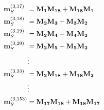 \begin{subequations}
\begin{align}
	  &  	& \mathmakebox[\widthof{$\mathbf{m}^{(3,153)}_S$}][l]{\mathbf{m}^{(3,17)}_S}  &= \mathbf{M_1M_{18}} + \mathbf{M_{18}M_1} & \\ 
	  &  	& \mathmakebox[\widthof{$\mathbf{m}^{(3,153)}_S$}][l]{\mathbf{m}^{(3,18)}_S}  &= \mathbf{M_2M_3} + \mathbf{M_3M_2}  &   	\\
	  &  	& \mathmakebox[\widthof{$\mathbf{m}^{(3,153)}_S$}][l]{\mathbf{m}^{(3,19)}_S}  &= \mathbf{M_2M_4} + \mathbf{M_4M_2}  &   	\\  
	  &  	& \mathmakebox[\widthof{$\mathbf{m}^{(3,153)}_S$}][l]{\mathbf{m}^{(3,20)}_S}  &= \mathbf{M_2M_5} + \mathbf{M_5M_2}  &   	\\
	  &     &  						 &  \vdots & 	\notag \\
	  &  	& \mathmakebox[\widthof{$\mathbf{m}^{(3,153)}_S$}][l]{\mathbf{m}^{(3,33)}_S}  &= \mathbf{M_2M_{18}} + \mathbf{M_{18}M_2}  &  \\
	  &     &  						 &  \vdots 	& 	\notag \\
	  &  	& \mathmakebox[\widthof{$\mathbf{m}^{(3,153)}_S$}][l]{\mathbf{m}^{(3,153)}_S} &= \mathbf{M_{17}M_{18}} + \mathbf{M_{18}M_{17}} &   
\end{align}
\end{subequations}
%
%    

